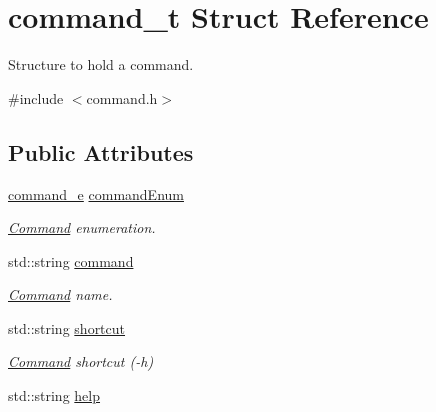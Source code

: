 \hypertarget{structcommand__t}{}\section{command\+\_\+t Struct Reference}
\label{structcommand__t}


Structure to hold a command.  




{\ttfamily \#include $<$command.\+h$>$}

\subsection*{Public Attributes}
\begin{DoxyCompactItemize}
\item 
\hypertarget{structcommand__t_a482126330d56b967d7428d61cc5b7d6b}{}\hyperlink{command_8h_aafce48252f7b3163fa15e458dd84ba12}{command\+\_\+e} \hyperlink{structcommand__t_a482126330d56b967d7428d61cc5b7d6b}{command\+Enum}\label{structcommand__t_a482126330d56b967d7428d61cc5b7d6b}

\begin{DoxyCompactList}\small\item\em \hyperlink{class_command}{Command} enumeration. \end{DoxyCompactList}\item 
\hypertarget{structcommand__t_ac126c83fffc4006f8573bb0913f0e210}{}std\+::string \hyperlink{structcommand__t_ac126c83fffc4006f8573bb0913f0e210}{command}\label{structcommand__t_ac126c83fffc4006f8573bb0913f0e210}

\begin{DoxyCompactList}\small\item\em \hyperlink{class_command}{Command} name. \end{DoxyCompactList}\item 
\hypertarget{structcommand__t_a2c5eb968130a5e8dcd441fa423008fbe}{}std\+::string \hyperlink{structcommand__t_a2c5eb968130a5e8dcd441fa423008fbe}{shortcut}\label{structcommand__t_a2c5eb968130a5e8dcd441fa423008fbe}

\begin{DoxyCompactList}\small\item\em \hyperlink{class_command}{Command} shortcut (-\/h) \end{DoxyCompactList}\item 
\hypertarget{structcommand__t_aea1619c73e305ebac8751c5aefdf7e6b}{}std\+::string \hyperlink{structcommand__t_aea1619c73e305ebac8751c5aefdf7e6b}{help}\label{structcommand__t_aea1619c73e305ebac8751c5aefdf7e6b}


\end{DoxyCompactItemize}
